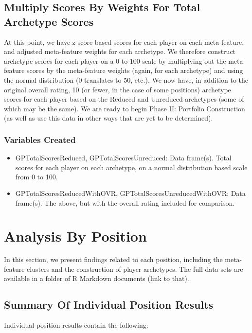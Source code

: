 \documentclass[11pt]{article}
\begin{document}
\subsection{Multiply Scores By Weights For Total Archetype Scores}

At this point, we have z-score based scores for each player on each meta-feature, and adjusted meta-feature weights for each archetype. We therefore construct archetype scores for each player on a 0 to 100 scale by multiplying out the meta-feature scores by the meta-feature weights (again, for each archetype) and using the normal distribution (0 translates to 50, etc.). We now have, in addition to the original overall rating, 10 (or fewer, in the case of some positions) archetype scores for each player based on the Reduced and Unreduced archetypes (some of which may be the same). We are ready to begin Phase II: Portfolio Construction (as well as use this data in other ways that are yet to be determined).

\subsubsection{Variables Created}

\begin{itemize}
\item{GPTotalScoresReduced, GPTotalScoresUnreduced}: Data frame(s). Total scores for each player on each archetype, on a normal distribution based scale from 0 to 100.
\item{GPTotalScoresReducedWithOVR, GPTotalScoresUnreducedWithOVR}: Data frame(s). The above, but with the overall rating included for comparison.
\end{itemize}


\section{Analysis By Position}
\label{ABP}

In this section, we present findings related to each position, including the meta-feature clusters and the construction of player archetypes. The full data sets are available in a folder of R Markdown documents (link to that).

\subsection{Summary Of Individual Position Results}

Individual position results contain the following:
\end{document}
